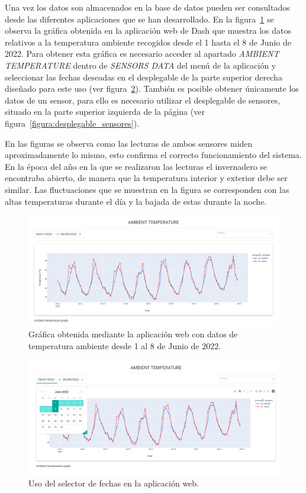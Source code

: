 \documentclass[a4paper, 12pt, oneside]{book}
\begin{document}
Una vez los datos son almacenados en la base de datos pueden ser consultados desde las diferentes aplicaciones que se han desarrollado.
En la figura~\ref{figura:ambient_temperature_01_08_junio} se observa la gráfica obtenida en la aplicación web de Dash que muestra los datos relativos a la temperatura ambiente recogidos desde el 1 hasta el 8 de Junio de 2022. Para obtener esta gráfica es necesario acceder al apartado \textit{AMBIENT TEMPERATURE} dentro de \textit{SENSORS DATA} del menú de la aplicación y seleccionar las fechas deseadas en el desplegable de la parte superior derecha diseñado para este uso (ver figura~\ref{figura:desplegable_fecha}). También es posible obtener únicamente los datos de un sensor, para ello es necesario utilizar el desplegable de sensores, situado en la parte superior izquierda de la página (ver figura~\ref{figura:desplegable_sensores}).

En las figuras se observa como las lecturas de ambos sensores miden aproximadamente lo mismo, esto confirma el correcto funcionamiento del sistema. En la época del año en la que se realizaron las lecturas el invernadero se encontraba abierto, de manera que la temperatura interior y exterior debe ser similar. Las fluctuaciones que se muestran en la figura se corresponden con las altas temperaturas durante el día y la bajada de estas durante la noche.

\begin{figure}[H]
	\centering
    \includegraphics[width=12cm, keepaspectratio]{img/ambient_temperature_01_08_junio}
    \caption{Gráfica obtenida mediante la aplicación web con datos de temperatura ambiente desde 1 al 8 de Junio de 2022.}
    \label{figura:ambient_temperature_01_08_junio}
\end{figure}

\begin{figure}[H]
	\centering
    \includegraphics[width=12cm, keepaspectratio]{img/desplegable_fecha}
    \caption{Uso del selector de fechas en la aplicación web.}
    \label{figura:desplegable_fecha}
\end{figure}
\end{document}
